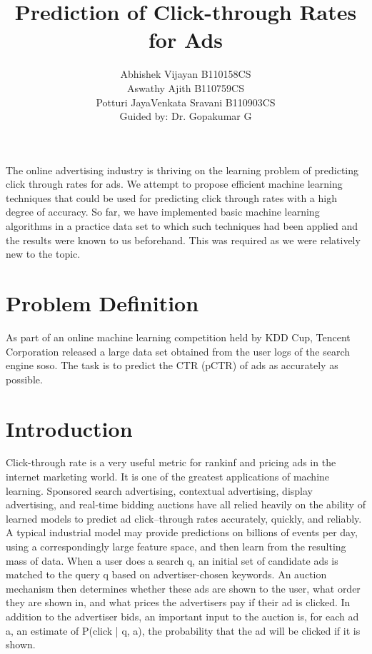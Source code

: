 \documentclass[10pt]{article}
\title{Prediction of Click-through Rates for Ads}
\author{ Abhishek Vijayan     B110158CS\\  Aswathy Ajith     B110759CS\\  Potturi JayaVenkata Sravani    B110903CS\\  Guided by: Dr. Gopakumar G}
\begin{document}
	
\maketitle
	

\abstract{} 
The online advertising industry is thriving on the learning problem of predicting click through rates for ads. We attempt to propose efficient machine learning techniques that could be used for predicting click through rates with a high degree of accuracy. So far, we have implemented basic machine learning algorithms in a practice data set to which such techniques had been applied and the results were known to us beforehand. This was required as we were relatively new to the topic. 
\section{Problem Definition}
As part of an online machine learning competition held by KDD Cup, Tencent Corporation released a large data set obtained from the user logs of the search engine soso. The task is to predict the CTR (pCTR) of ads as accurately as possible.
\section{Introduction}
Click-through rate is a very useful metric for rankinf and pricing ads in the internet marketing world. It is one of the greatest applications of machine learning. Sponsored search advertising, contextual advertising, display advertising, and real-time bidding auctions have all relied heavily on the ability of learned models to predict ad click–through rates accurately, quickly, and reliably.  A typical industrial model may provide predictions on billions of events per day, using a correspondingly large feature space, and then learn from the resulting mass of data. When a user does a search q, an initial set of candidate ads is matched to the query q based on advertiser-chosen keywords. An auction mechanism then determines whether these ads are shown to the user, what order they are shown in, and what prices the advertisers pay if their ad is clicked. In addition to the advertiser bids, an important input to the auction is, for each ad a, an estimate of P(click | q, a), the probability that the ad will be clicked if it is shown.
\end{document}
